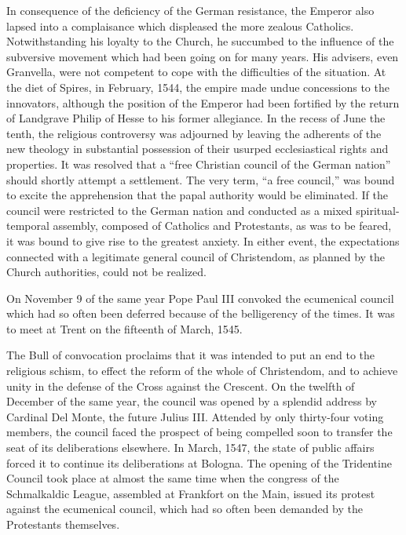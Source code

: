 In consequence of the deficiency of the German resistance, the Emperor
also lapsed into a complaisance which displeased the more zealous
Catholics. Notwithstanding his loyalty to the Church, he succumbed
to the influence of the subversive movement which had been going
on for many years. His advisers, even Granvella, were not competent
to cope with the difficulties of the situation. At the diet of Spires, in
February, 1544, the empire made undue concessions to the innovators,
although the position of the Emperor had been fortified by the return
of Landgrave Philip of Hesse to his former allegiance. In the
recess of June the tenth, the religious controversy was adjourned by
leaving the adherents of the new theology in substantial possession
of their usurped ecclesiastical rights and properties. It was resolved
that a “free Christian council of the German nation” should shortly
attempt a settlement. The very term, “a free council,” was bound to
excite the apprehension that the papal authority would be eliminated.
If the council were restricted to the German nation and conducted as
a mixed spiritual-temporal assembly, composed of Catholics and
Protestants, as was to be feared, it was bound to give rise to the greatest
anxiety. In either event, the expectations connected with a legitimate
general council of Christendom, as planned by the Church authorities,
could not be realized.

On November 9 of the same year Pope Paul III convoked the ecumenical council
which had so often been deferred because of the
belligerency of the times. It was to meet at Trent on the fifteenth of
March, 1545.

The Bull of convocation proclaims that it was intended to put
an end to the religious schism, to effect the reform of the whole of
Christendom, and to achieve unity in the defense of the Cross against
the Crescent. On the twelfth of December of the same year, the council
was opened by a splendid address by Cardinal Del Monte, the future
Julius III. Attended by only thirty-four voting members, the council
faced the prospect of being compelled soon to transfer the seat of its
deliberations elsewhere. In March, 1547, the state of public affairs
forced it to continue its deliberations at Bologna. The opening of the
Tridentine Council took place at almost the same time when the congress
of the Schmalkaldic League, assembled at Frankfort on the Main,
issued its protest against the ecumenical council, which had so often
been demanded by the Protestants themselves.

